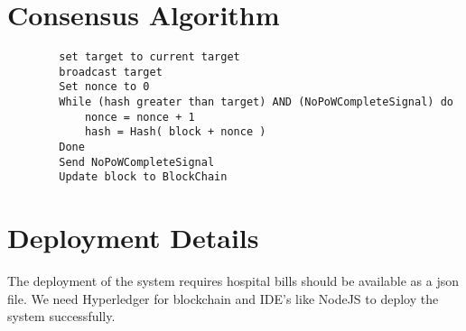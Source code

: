 \section{Consensus Algorithm}
\begin{verbatim}
        set target to current target
        broadcast target
        Set nonce to 0
        While (hash greater than target) AND (NoPoWCompleteSignal) do
            nonce = nonce + 1
            hash = Hash( block + nonce )
        Done
        Send NoPoWCompleteSignal
        Update block to BlockChain
\end{verbatim}

\section{Deployment Details}
The deployment of the system requires hospital bills should be
available as a json file. We need Hyperledger for blockchain and IDE’s like NodeJS to deploy the system successfully.
